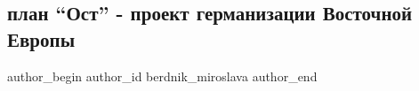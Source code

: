  
 
 
 
 
 
\subsection{план \enquote{Ост} -  проект германизации Восточной Европы}
\label{sec:22_06_2018.fb.berdnik_miroslava.1.plan_ost_nacizm}
\ifcmt
 author_begin
   author_id berdnik_miroslava
 author_end
\fi

